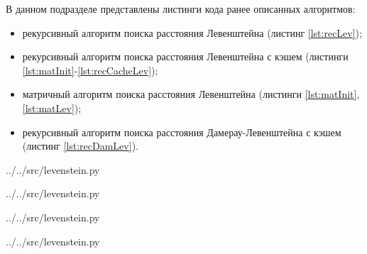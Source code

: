 В данном подразделе представлены листинги кода ранее описанных алгоритмов:
\begin{itemize}[left=\parindent]
    \item рекурсивный алгоритм поиска расстояния Левенштейна (листинг
          \ref{lst:recLev});
    \item рекурсивный алгоритм поиска расстояния Левенштейна с кэшем (листинги
          \ref{lst:matInit}-\ref{lst:recCacheLev});
    \item матричный алгоритм поиска расстояния Левенштейна (листинги
          \ref{lst:matInit}, \ref{lst:matLev});
    \item рекурсивный алгоритм поиска расстояния Дамерау-Левенштейна с кэшем
          (листинг \ref{lst:recDamLev}).
\end{itemize}

\noindent
\begin{minipage}{\linewidth}
\begin{lstinputlisting}[
	caption={Реализация рекурсивного алгоритма поиска расстояния Левенштейна},
	label={lst:recLev},
	linerange={20-35}
]{../../src/levenstein.py}
\end{lstinputlisting}
\end{minipage}

\noindent
\begin{minipage}{\linewidth}
\begin{lstinputlisting}[
	caption={Реализация инициализации матрицы},
	label={lst:matInit},
	linerange={3-7}
]{../../src/levenstein.py}
\end{lstinputlisting}
\end{minipage}

\noindent
\begin{minipage}{\linewidth}
\begin{lstinputlisting}[
    caption={Реализация инициализации данных для рекурсивного алгоритма поиска
             расстояния Левенштейна с кэшем},
	label={lst:recCacheLevInit},
	linerange={78-85}
]{../../src/levenstein.py}
\end{lstinputlisting}
\end{minipage}

\noindent
\begin{minipage}{\linewidth}
\begin{lstinputlisting}[
	caption={Реализация рекурсивного алгоритма поиска расстояния Левенштейна с кэшем},
	label={lst:recCacheLev},
	linerange={55-74}
]{../../src/levenstein.py}
\end{lstinputlisting}
\end{minipage}

